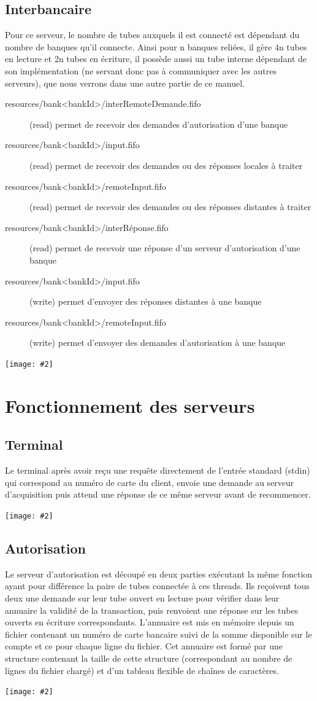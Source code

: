 \documentclass[french, a4paper, 12pt, titlepage]{article}
\newcommand{\graph}[2]{
\medskip
	\begin{center}
		\texttt{[image: \#2]}
	\end{center}
\medskip
}
\begin{document}
\subsection{Interbancaire}
Pour ce serveur, le nombre de tubes auxquels il est connecté est dépendant du nombre de banques qu'il connecte.
Ainsi pour n banques reliées, il gère 4n tubes en lecture et 2n tubes en écriture, il possède aussi un tube interne dépendant de son implémentation (ne servant donc pas à communiquer avec les autres serveurs), que nous verrons dans une autre partie de ce manuel.

\begin{description}
	\item[resources/bank<bankId>/interRemoteDemande.fifo] (read) permet de recevoir des demandes d'autorisation d'une banque
	\item[resources/bank<bankId>/input.fifo] (read) permet de recevoir des demandes ou des réponses locales à traiter
	\item[resources/bank<bankId>/remoteInput.fifo] (read) permet de recevoir des demandes ou des réponses distantes à traiter
	\item[resources/bank<bankId>/interRéponse.fifo] (read) permet de recevoir une réponse d'un serveur d'autorisation d'une banque
	\item[resources/bank<bankId>/input.fifo] (write) permet d'envoyer des réponses distantes à une banque
	\item[resources/bank<bankId>/remoteInput.fifo] (write) permet d'envoyer des demandes d'autorisation à une banque
\end{description}
\graph{0.5}{interbancaire}

\section{Fonctionnement des serveurs}
\subsection{Terminal}
Le terminal après avoir reçu une requête directement de l'entrée standard (stdin) qui correspond au numéro de carte du client, envoie une demande au serveur d'acquisition puis attend une réponse de ce même serveur avant de recommencer.
\graph{0.4}{terminalState}

\subsection{Autorisation}
Le serveur d'autorisation est découpé en deux parties exécutant la même fonction ayant pour différence la paire de tubes connectée à ces threads.
Ils reçoivent tous deux une demande sur leur tube ouvert en lecture pour vérifier dans leur annuaire la validité de la transaction, puis renvoient une réponse sur les tubes ouverts en écriture correspondants.
L'annuaire est mis en mémoire depuis un fichier contenant un numéro de carte bancaire suivi de la somme disponible sur le compte et ce pour chaque ligne du fichier.
Cet annuaire est formé par une structure contenant la taille de cette structure (correspondant au nombre de lignes du fichier chargé) et d'un tableau flexible de chaînes de caractères.
\graph{0.4}{autorisationState}
\end{document}
